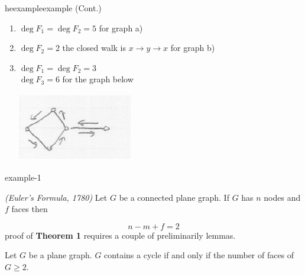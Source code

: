 \documentclass[12pt]{article}
\makeatletter
\newenvironment{theorem}[1]{%
  \renewcommand\themanualtheoreminner{#1}%
  \manualtheoreminner
}{\endmanualtheoreminner}
\newenvironment{lemma}[1]{
  \renewcommand\thecustomlemma{#1}\customlemma
}{\endcustomlemma}
\newenvironment{usecounterof}[2]{%
  \def\@tempb{#1}%
  \expandafter\renewcommand\csname the#1\endcsname{\ref{#2}}\@nameuse\@tempb}{%
    \@nameuse{end\@tempb}\addtocounter\@tempb{-1}}
\makeatother
\begin{document}
\begin{usecounterof}{example}{a-thm} (Cont.)
	\begin{enumerate}
		\item $\deg F_{1} = \deg F_{2} = 5$ for graph a)
		\item $\deg F_{2} = 2$ the closed walk is $x\to y \to x$ for graph b)
		\item $\deg F_{1} = \deg F_{2} = 3$\\
		      $\deg F_{3} = 6$ for the graph below

		      \begin{center}
			      \includegraphics[width=5cm, height=3cm]{facegraph}
		      \end{center}
	\end{enumerate}


\end{usecounterof}


\begin{theorem}{1}
	\textit{(Euler's Formula, 1780)} Let $G$ be a connected plane graph. If $G$ has $n$ nodes and $f$ faces then

	\[n - m + f = 2\]
	proof of \textbf{Theorem 1} requires a couple of preliminarily lemmas.
\end{theorem}

\begin{lemma}{2}
	Let $G$ be a plane graph. $G$ contains a cycle if and only if the number of faces of $G \ge 2$.
\end{lemma}
\end{document}
